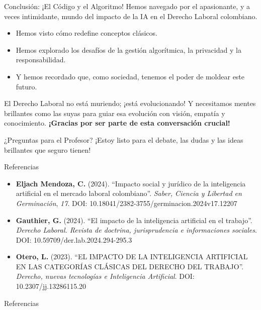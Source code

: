 \documentclass[aspectratio=169]{beamer}
\begin{document}
\begin{frame}{Conclusión: ¡El Código y el Algoritmo!}
Hemos navegado por el apasionante, y a veces intimidante, mundo del impacto de la IA en el Derecho Laboral colombiano.
\begin{itemize}
  \item Hemos visto cómo redefine conceptos clásicos.
  \item Hemos explorado los desafíos de la gestión algorítmica, la privacidad y la responsabilidad.
  \item Y hemos recordado que, como sociedad, tenemos el poder de moldear este futuro.
\end{itemize}
El Derecho Laboral no está muriendo; ¡está evolucionando! Y necesitamos mentes brillantes como las suyas para guiar esa evolución con visión, empatía y conocimiento.
\textbf{¡Gracias por ser parte de esta conversación crucial!}
\end{frame}


\begin{frame}{¿Preguntas para el Profesor?}
¡Estoy listo para el debate, las dudas y las ideas brillantes que seguro tienen!
\end{frame}


\begin{frame}{Referencias}
\begin{itemize}
  \item \textbf{Eljach Mendoza, C.} (2024). ``Impacto social y jurídico de la inteligencia artificial en el mercado laboral colombiano''. \textit{Saber, Ciencia y Libertad en Germinación}, \textit{17}. DOI: 10.18041/2382-3755/germinacion.2024v17.12207
  \item \textbf{Gauthier, G.} (2024). ``El impacto de la inteligencia artificial en el trabajo''. \textit{Derecho Laboral. Revista de doctrina, jurisprudencia e informaciones sociales}. DOI: 10.59709/der.lab.2024.294-295.3
  \item \textbf{Otero, L.} (2023). ``EL IMPACTO DE LA INTELIGENCIA ARTIFICIAL EN LAS CATEGORÍAS CLÁSICAS DEL DERECHO DEL TRABAJO''. \textit{Derecho, nuevas tecnologías e Inteligencia Artificial}. DOI: 10.2307/jj.13286115.20
\end{itemize}
\end{frame}



\begin{frame}[allowframebreaks]{Referencias}
  
  
\end{frame}
\end{document}
